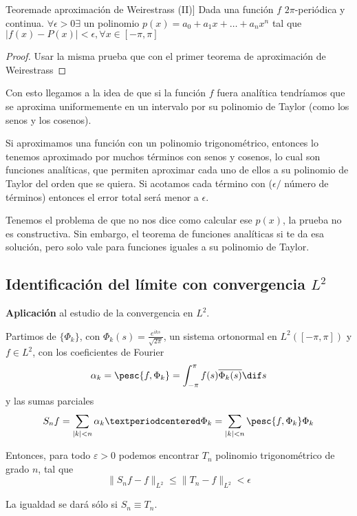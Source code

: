 		\begin{theorem}Teorema\IS de aproximación de Weirestrass (II)] \label{thm:AproxWeierstrass2}
		Dada una función $f$ $2\pi$-periódica y continua. $\forall \epsilon > 0 \exists$ un polinomio $p(x)= a_0 + a_1 x + … + a_n x^n $ tal que $|f(x)-P(x)| < \epsilon, \forall x \in [-\pi,\pi]$
		\end{theorem}

		\begin{proof}
			Usar la misma prueba que con el primer teorema de aproximación de Weirestrass
		\end{proof}

		Con esto llegamos a la idea de que si la función $f$ fuera analítica tendríamos que se aproxima uniformemente en un intervalo por su polinomio de Taylor (como los senos y los cosenos).

		Si aproximamos una función con un polinomio trigonométrico, entonces lo tenemos aproximado por muchos términos con senos y cosenos, lo cual son funciones analíticas, que permiten aproximar cada uno de ellos a su polinomio de Taylor del orden que se quiera. Si acotamos cada término con ($\epsilon / $ número de términos) entonces el error total será menor a $\epsilon$.

		Tenemos el problema de que no nos dice como calcular ese $p(x)$, la prueba no es constructiva. Sin embargo, el teorema de funciones analíticas si te da esa solución, pero solo vale para funciones iguales a su polinomio de Taylor.

		\subsection{Identificación del límite con convergencia $L^2$}
		\textbf{Aplicación} al estudio de la convergencia en $L^2$.

		\begin{theorem} \label{thm:ConvergenciaL2}
			Partimos de $\{\Phi_k\}$, con $\Phi_k(s) = \frac{e^{iks}}{\sqrt{2\pi}}$, un sistema ortonormal en $L^2([-\pi,\pi])$ y $f \in L^2$, con los coeficientes de Fourier
			\[\alpha_k = \pesc{f, \Phi_{k}} = \int_{-\pi}^\pi f(s) \overline{\Phi_k(s)} \dif s  \] y las sumas parciales
			\[  S_n f = \sum_{|k| < n} \alpha_k · \Phi_k = \sum_{|k| < n}\pesc{f, \Phi_k} \Phi_k \]

			Entonces, para todo $ε > 0$ podemos encontrar $T_n$ polinomio trigonométrico de grado $n$, tal que
			\[ \| S_n f - f\|_{L^2} \leq \| T_n - f \|_{L^2} < \epsilon \]

			La igualdad se dará sólo si $S_n \equiv T_n$.

		\end{theorem}

